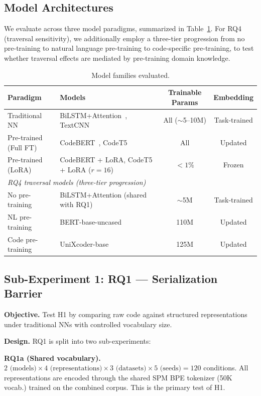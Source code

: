 \documentclass[pdflatex,sn-mathphys,Numbered]{sn-jnl}
\begin{document}
\subsection{Model Architectures}

We evaluate across three model paradigms, summarized in Table~\ref{tab:models}. For RQ4 (traversal sensitivity), we additionally employ a three-tier progression from no pre-training to natural language pre-training to code-specific pre-training, to test whether traversal effects are mediated by pre-training domain knowledge.

\begin{table}[tb]
\centering
\caption{Model families evaluated.}\label{tab:models}
\begin{tabular}{llcc}
\toprule
Paradigm & Models & Trainable Params & Embedding \\
\midrule
Traditional NN       & BiLSTM+Attention~\citep{luong2015attn}, TextCNN~\citep{kim2014cnn} & All ($\sim$5--10M) & Task-trained \\
Pre-trained (Full FT)& CodeBERT~\citep{feng2020codebert}, CodeT5~\citep{wang2021codet5} & All & Updated \\
Pre-trained (LoRA)   & CodeBERT + LoRA, CodeT5 + LoRA ($r = 16$)~\citep{hu2022lora} & $<1\%$ & Frozen \\
\midrule
\multicolumn{4}{l}{\textit{RQ4 traversal models (three-tier progression)}} \\
No pre-training    & BiLSTM+Attention (shared with RQ1) & $\sim$5M & Task-trained \\
NL pre-training    & BERT-base-uncased~\citep{devlin2019bert} & 110M & Updated \\
Code pre-training  & UniXcoder-base~\citep{guo2022unixcoder} & 125M & Updated \\
\bottomrule
\end{tabular}
\end{table}

\subsection{Sub-Experiment 1: RQ1 --- Serialization Barrier}

\textbf{Objective.} Test H1 by comparing raw code against structured representations under traditional NNs with controlled vocabulary size.

\textbf{Design.} RQ1 is split into two sub-experiments:

\textbf{RQ1a (Shared vocabulary).} $2 \text{ (models)} \times 4 \text{ (representations)} \times 3 \text{ (datasets)} \times 5 \text{ (seeds)} = 120$ conditions. All representations are encoded through the shared SPM BPE tokenizer (50K vocab.) trained on the combined corpus. This is the primary test of H1.
\end{document}

